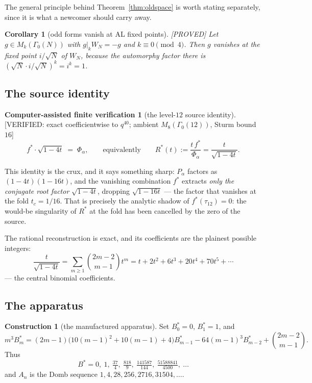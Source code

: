 \documentclass[11pt,reqno]{amsart}
\theoremstyle{plain}
\newtheorem{corollary}[theorem]{Corollary}
\theoremstyle{definition}
\newtheorem{verification}[theorem]{Computer-assisted finite verification}
\newtheorem{construction}[theorem]{Construction}
\theoremstyle{remark}
\newcommand{\fs}{f^{*}}
\newcommand{\Proved}{\textup{\textsf{[PROVED]}}}
\newcommand{\VerifiedR}[1]{\textup{\textsf{[VERIFIED: #1]}}}
\begin{document}
The general principle behind Theorem~\ref{thm:oldspace} is worth stating
separately, since it is what a newcomer should carry away.

\begin{corollary}[odd forms vanish at AL fixed points]\label{cor:oddvanish}
\Proved{} Let $g\in M_k(\Gamma_0(N))$ with $g|_kW_N=-g$ and $k\equiv0\pmod
4$. Then $g$ vanishes at the fixed point $i/\sqrt N$ of $W_N$, because the
automorphy factor there is $(\sqrt N\cdot i/\sqrt N)^k=i^k=1$.
\end{corollary}

\subsection{The source identity}
\begin{verification}[the level-$12$ source identity]\label{ver:src12}
\VerifiedR{exact coefficientwise to $q^{40}$; ambient $M_8(\Gamma_0(12))$,
Sturm bound $16$}
\[
\fs\cdot\sqrt{1-4t}\;=\;\Phi_\alpha ,
\qquad\text{equivalently}\qquad
R^*(t):=\frac{t\,\fs}{\Phi_\alpha}=\frac{t}{\sqrt{1-4t}} .
\]
\end{verification}

This identity is the crux, and it says something sharp: $P_\alpha$
factors as $(1-4t)(1-16t)$, and the vanishing combination $\fs$
extracts \emph{only the conjugate root factor} $\sqrt{1-4t}$, dropping
$\sqrt{1-16t}$ --- the factor that vanishes at the fold $t_c=1/16$.
That is precisely the analytic shadow of $\fs(\tau_{12})=0$: the
would-be singularity of $R^*$ at the fold has been cancelled by the zero
of the source.

The rational reconstruction is exact, and its coefficients are the plainest
possible integers:
\[
\frac{t}{\sqrt{1-4t}}=\sum_{m\ge1}\binom{2m-2}{m-1}t^m
= t+2t^2+6t^3+20t^4+70t^5+\cdots
\]
--- the central binomial coefficients.

\subsection{The apparatus}
\begin{construction}[the manufactured apparatus]\label{con:app}
Set $B^*_0=0$, $B^*_1=1$, and
\begin{equation}\label{eq:starrec}
m^3B^*_m=(2m-1)\bigl(10(m-1)^2+10(m-1)+4\bigr)B^*_{m-1}
-64(m-1)^3B^*_{m-2}+\binom{2m-2}{m-1}.
\end{equation}
Thus
\[
B^*=0,\ 1,\ \tfrac{37}4,\ \tfrac{818}9,\ \tfrac{141587}{144},\
\tfrac{51588841}{4500},\ \dots
\]
and $A_n$ is the Domb sequence
$1,4,28,256,2716,31504,\dots$.
\end{construction}
\end{document}
